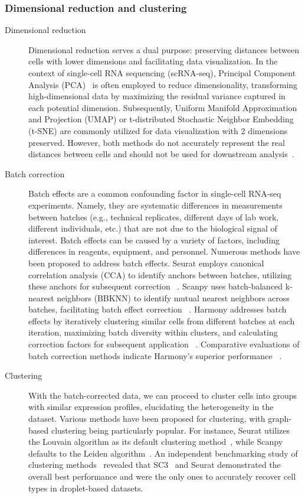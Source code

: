 \subsubsection{Dimensional reduction and clustering}
\label{background:sec2:dr_n_clustering}
\begin{description}
	\item[Dimensional reduction]
	Dimensional reduction serves a dual purpose: preserving distances between cells with lower dimensions and facilitating data visualization. In the context of single-cell RNA sequencing (scRNA-seq), Principal Component Analysis (PCA)~\citep{hotelling1933pca} is often employed to reduce dimensionality, transforming high-dimensional data by maximizing the residual variance captured in each potential dimension. Subsequently, Uniform Manifold Approximation and Projection (UMAP) or t-distributed Stochastic Neighbor Embedding (t-SNE) are commonly utilized for data visualization with 2 dimensions preserved. However, both methods do not accurately represent the real distances between cells and should not be used for downstream analysis~\citep{mcinnes2018umap, van2008tsne}.

	\item[Batch correction]
	Batch effects are a common confounding factor in single-cell RNA-seq experiments. Namely, they are systematic differences in measurements between batches (e.g., technical replicates, different days of lab work, different individuals, etc.) that are not due to the biological signal of interest. Batch effects can be caused by a variety of factors, including differences in reagents, equipment, and personnel. Numerous methods have been proposed to address batch effects. Seurat employs canonical correlation analysis (CCA) to identify anchors between batches, utilizing these anchors for subsequent correction ~\citep{stuart2019seurat3}. Scanpy uses batch-balanced k-nearest neighbors (BBKNN) to identify mutual nearest neighbors across batches, facilitating batch effect correction ~\citep{polanski2020bbknn}. Harmony addresses batch effects by iteratively clustering similar cells from different batches at each iteration, maximizing batch diversity within clusters, and calculating correction factors for subsequent application ~\citep{korsunsky2019harmony}. Comparative evaluations of batch correction methods indicate Harmony's superior performance ~\citep{tran2020benchmark}. 

	\item[Clustering] 
	With the batch-corrected data, we can proceed to cluster cells into groups with similar expression profiles, elucidating the heterogeneity in the dataset. Various methods have been proposed for clustering, with graph-based clustering being particularly popular. For instance, Seurat utilizes the Louvain algorithm as its default clustering method~\citep{stuart2019seurat3}, while Scanpy defaults to the Leiden algorithm~\citep{traag2019louvain}. An independent benchmarking study of clustering methods~\citep{duo2018benchclustering} revealed that SC3~\citep{kiselev2017sc3} and Seurat demonstrated the overall best performance and were the only ones to accurately recover cell types in droplet-based datasets.	

\end{description}
